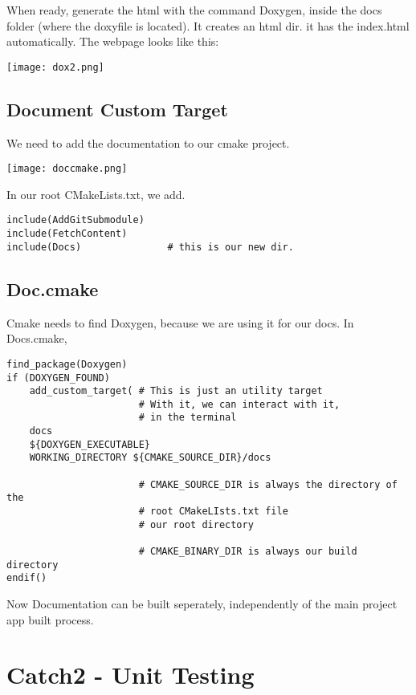 \documentclass[openany]{report}
\begin{document}
When ready, generate the html with the command Doxygen, inside the docs folder (where the doxyfile is located). It creates an html dir.
it has the index.html automatically. The webpage looks like this:


\begin{center}
    \texttt{[image: dox2.png]}
\end{center}


\subsection{Document Custom Target}

We need to add the documentation to our cmake project.

\begin{center}
    \texttt{[image: doccmake.png]}
\end{center}

In our root CMakeLists.txt, we add.

\begin{verbatim}
include(AddGitSubmodule)
include(FetchContent)
include(Docs)               # this is our new dir.

\end{verbatim}


\subsection{Doc.cmake}

Cmake needs to find Doxygen, because we are using it for our docs. In Docs.cmake,

\begin{verbatim}
find_package(Doxygen)
if (DOXYGEN_FOUND)
    add_custom_target( # This is just an utility target
                       # With it, we can interact with it, 
                       # in the terminal
    docs
    ${DOXYGEN_EXECUTABLE}
    WORKING_DIRECTORY ${CMAKE_SOURCE_DIR}/docs

                       # CMAKE_SOURCE_DIR is always the directory of the
                       # root CMakeLIsts.txt file
                       # our root directory

                       # CMAKE_BINARY_DIR is always our build directory
endif()
\end{verbatim}

Now Documentation can be built seperately, independently of the main project app built process.

\section{Catch2 - Unit Testing}
\end{document}
